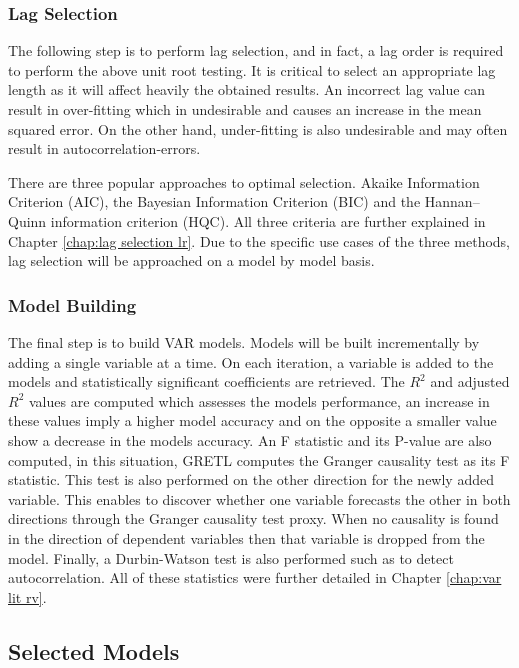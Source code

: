 \subsubsection{Lag Selection}

The following step is to perform lag selection, and in fact, a lag order is required to perform the above unit root testing. It is critical to select an appropriate lag length as it will affect heavily the obtained results. An incorrect lag value can result in over-fitting which in undesirable and causes an increase in the mean squared error. On the other hand, under-fitting is also undesirable and may often result in autocorrelation-errors.

There are three popular approaches to optimal selection. Akaike Information Criterion (AIC), the Bayesian Information Criterion (BIC) and the Hannan–Quinn information criterion (HQC). All three criteria are further explained in Chapter \ref{chap:lag selection lr}. Due to the specific use cases of the three methods, lag selection will be approached on a model by model basis.

\subsubsection{Model Building}

The final step is to build VAR models. Models will be built incrementally by adding a single variable at a time.  On each iteration, a variable is added to the models and statistically significant coefficients are retrieved. The $R^2$ and adjusted $R^2$ values are computed which assesses the models performance, an increase in these values imply a higher model accuracy and on the opposite a smaller value show a decrease in the models accuracy. An F statistic and its P-value are also computed, in this situation, GRETL computes the Granger causality test as its F statistic. This test is also performed on the other direction for the newly added variable. This enables to discover whether one variable forecasts the other in both directions through the Granger causality test proxy. When no causality is found in the direction of dependent variables then that variable is dropped from the model. Finally, a Durbin-Watson test is also performed such as to detect autocorrelation. All of these statistics were further detailed in Chapter \ref{chap:var lit rv}.

\subsection{Selected Models}

